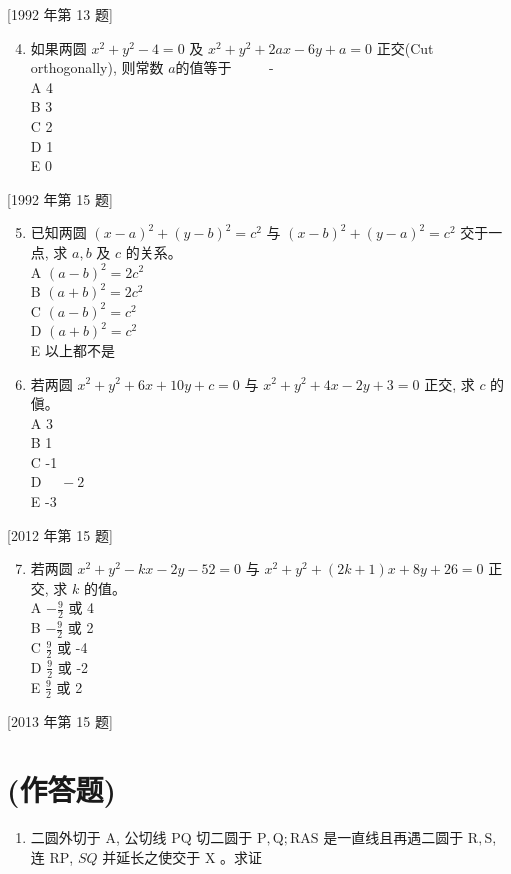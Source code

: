 \documentclass[10pt]{article}
\begin{document}
[1992 年第 13 题]

\begin{enumerate}
  \setcounter{enumi}{3}
  \item 如果两圆 $x^{2}+y^{2}-4=0$ 及 $x^{2}+y^{2}+2 a x-6 y+a=0$ 正交(Cut orthogonally), 则常数 $a$的值等于 $\qquad$ -\\
A 4\\
B 3\\
C 2\\
D 1\\
E 0
\end{enumerate}

[1992 年第 15 题]

\begin{enumerate}
  \setcounter{enumi}{4}
  \item 已知两圆 $(x-a)^{2}+(y-b)^{2}=c^{2}$ 与 $(x-b)^{2}+(y-a)^{2}=c^{2}$ 交于一点, 求 $a, b$ 及 $c$ 的关系。\\
A $(a-b)^{2}=2 c^{2}$\\
B $(a+b)^{2}=2 c^{2}$\\
C $(a-b)^{2}=c^{2}$\\
D $(a+b)^{2}=c^{2}$\\
E 以上都不是

  \item 若两圆 $x^{2}+y^{2}+6 x+10 y+c=0$ 与 $x^{2}+y^{2}+4 x-2 y+3=0$ 正交, 求 $c$ 的傎。\\
A 3\\
B 1\\
C -1\\
D $\quad-2$\\
E -3

\end{enumerate}

[2012 年第 15 题]

\begin{enumerate}
  \setcounter{enumi}{6}
  \item 若两圆 $x^{2}+y^{2}-k x-2 y-52=0$ 与 $x^{2}+y^{2}+(2 k+1) x+8 y+26=0$ 正交, 求 $k$ 的值。\\
A $-\frac{9}{2}$ 或 4\\
B $-\frac{9}{2}$ 或 2\\
C $\frac{9}{2}$ 或 -4\\
D $\frac{9}{2}$ 或 -2\\
E $\frac{9}{2}$ 或 2
\end{enumerate}

[2013 年第 15 题]

\section*{(作答题)}
\begin{enumerate}
  \item 二圆外切于 $\mathrm{A}$, 公切线 $\mathrm{PQ}$ 切二圆于 $\mathrm{P}, \mathrm{Q} ; \mathrm{RAS}$ 是一直线且再遇二圆于 $\mathrm{R}, \mathrm{S}$, 连 $\mathrm{RP}$, $S Q$ 并延长之使交于 $\mathrm{X}$ 。求证
\end{enumerate}
\end{document}
